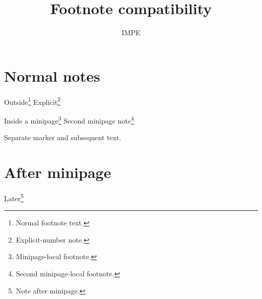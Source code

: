 \documentclass{impeart}
\title{Footnote compatibility}
\author{IMPE}
\begin{document}
\maketitle
\section{Normal notes}
Outside\footnote{Normal footnote text.}
Explicit\footnote[7]{Explicit-number note.}
\begin{minipage}{0.75\linewidth}
Inside a minipage\footnote{Minipage-local footnote.}
Second minipage note\footnote{Second minipage-local footnote.}
\end{minipage}
\par
Separate marker\footnotemark{} and subsequent text.
\section{After minipage}
Later\footnote{Note after minipage.}
\end{document}
